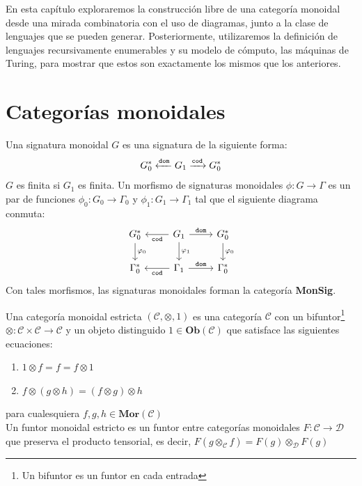 \documentclass[../main.tex]{subfiles}
\begin{document}
	
En esta capítulo exploraremos la construcción libre de una categoría monoidal desde una mirada combinatoria con el uso de diagramas, junto a la clase de lenguajes que se pueden generar. Posteriormente, utilizaremos la definición de lenguajes recursivamente enumerables y su modelo de cómputo, las máquinas de Turing, para mostrar que estos son exactamente los mismos que los anteriores. 
	
\section{Categorías monoidales}

\begin{dfn}
	Una signatura monoidal $G$ es una signatura de la siguiente forma: 
	$$G_0^* \xleftarrow{\tt{dom}} G_1 \xrightarrow{\tt{cod}} G_0^*$$
	$G$ es finita si $G_1$ es finita. Un morfismo de signaturas monoidales \( \phi:G \to \Gamma\) es un par de funciones \( \phi_0: G_0 \to \Gamma_0\) y \( \phi_1: G_1 \to \Gamma_1\) tal que el siguiente diagrama conmuta: 
	\[
	\begin{tikzcd}
		G_0^* \arrow{d}{\phi_0} & G_1 \arrow{r}{\tt{dom}} \arrow{l}{\tt{cod}} \arrow{d}{\phi_1} & G_0^* \arrow{d}{\phi_0} \\
		\Gamma_0^* & \Gamma_1 \arrow{r}{\tt{dom}} \arrow{l}{\tt{cod}} & \Gamma_0^*
	\end{tikzcd}
	\]
	Con tales morfismos, las signaturas monoidales forman la categoría \textbf{MonSig}.	
\end{dfn}

\begin{dfn}
	Una categoría monoidal estricta $(\mathcal{C}, \otimes, 1)$ es una categoría $\mathcal{C}$ con un bifuntor\footnote{Un bifuntor es un funtor en cada entrada} $\otimes : \mathcal{C} \times \mathcal{C} \to \mathcal{C}$ y un objeto distinguido $1 \in \textbf{Ob}(\mathcal{C})$ que satisface las siguientes ecuaciones:
	\begin{enumerate}
		\item $1 \otimes f = f = f \otimes 1$
		\item $f \otimes (g \otimes h) = (f \otimes g) \otimes h$
	\end{enumerate} 
	para cualesquiera $f, g, h \in \textbf{Mor}(\mathcal{C})$\\
	Un funtor monoidal estricto es un funtor entre categorías monoidales $F : \mathcal{C} \to \mathcal{D}$ que preserva el producto tensorial, es decir, $F(g \otimes_{\mathcal{C}} f) = F(g) \otimes_{\mathcal{D}} F(g)$
\end{dfn}
\end{document}
